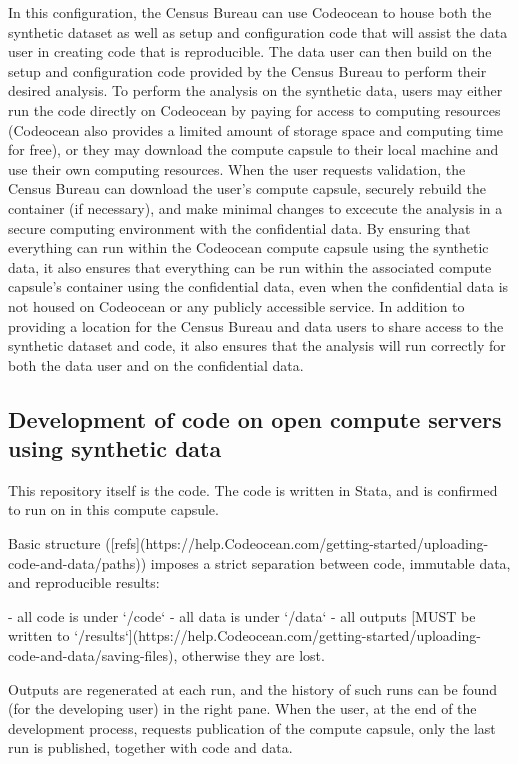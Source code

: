 \documentclass[]{hdsr}
\begin{document}
In this configuration, the Census Bureau can use Codeocean to house both the synthetic dataset as well as
setup and configuration code that will assist the data user in creating code that is reproducible. The data
user can then build on the setup and configuration code provided by the Census Bureau to perform their
desired analysis. To perform the analysis on the synthetic data, users may either run the code directly on
Codeocean by paying for access to computing resources (Codeocean also provides a limited amount of
storage space and computing time for free), or they may download the compute capsule to their local
machine and use their own computing resources. When the user requests validation, the Census
Bureau can download the user’s compute capsule, securely rebuild the container (if necessary), and make minimal changes to excecute the analysis in a
secure computing environment with the confidential data. By ensuring that everything can
run within the Codeocean compute capsule using the synthetic data, it also ensures that everything can
be run within the associated compute capsule's container using the confidential data, even when the confidential data is not housed on Codeocean or any publicly accessible service.
In addition to providing a location for the Census Bureau and data users to share access to the synthetic
dataset and code, it also ensures that the analysis will run correctly for both the data user and on the
confidential data. 



\subsection{Development of code on open compute servers using synthetic data}

This repository itself is the code. The code is written in Stata, and is confirmed to run on in this compute capsule.

Basic structure ([refs](https://help.Codeocean.com/getting-started/uploading-code-and-data/paths)) imposes a strict separation between code, immutable data, and reproducible results:

- all code is under `/code`
- all data is under `/data`
- all outputs [MUST be written to `/results`](https://help.Codeocean.com/getting-started/uploading-code-and-data/saving-files), otherwise they are lost. 

Outputs are regenerated at each run, and the history of such runs can be found (for the developing user) in the right pane. When the user, at the end of the development process, requests publication of the compute capsule, only the last run is published, together with code and data.
\end{document}
